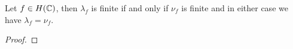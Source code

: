 \begin{proposition}
    Let $f \in H(\mathbb{C})$, then $\lambda_f$ is finite if and only if $\nu_f$ is finite and in either case we have $\lambda_f = \nu_f$.
\end{proposition}

\begin{proof}
\end{proof}

\iffalse
\begin{example} \label{exm:exponent-of-convergence}
    Consider $f(z) \coloneqq \sin(z) \in H(\C)$, we want to calculate $\lambda_f$ and $\rho_f$. First, let $\lambda > 0$ and recall that $f$ has zeros at $(n \pi)_{n \in \Z}$. Since
    $$ \sum_{n \in \Z \setminus \{0\}} \frac{1}{\vert n \pi \vert^\lambda} = \frac{2}{\pi^\lambda} \sum_{n=1}^\infty \frac{1}{n^\lambda} $$
    is finite if and only if $\lambda > 1$, we obtain $\lambda_f = 1$. Furthermore, we have $\vert \sin(z) \vert \leq e^{\vert z \vert}$
    and therefore $M_f(r) \leq e^r$, whereby $\rho_f \leq 1$. Finally, \Cref{thm:inequality-order-exponent-of-convergence} concludes $\rho_f = 1$.
\end{example}
\fi